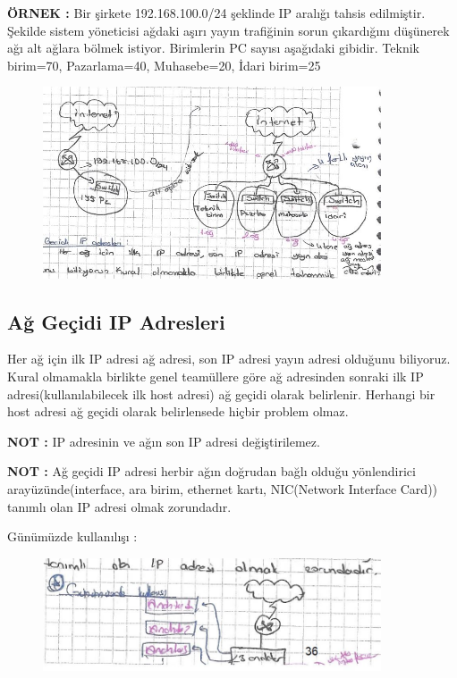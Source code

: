 \textbf{ÖRNEK : } Bir şirkete 192.168.100.0/24 şeklinde IP aralığı tahsis edilmiştir. Şekilde sistem yöneticisi ağdaki aşırı yayın trafiğinin sorun çıkardığını düşünerek ağı alt ağlara bölmek istiyor. Birimlerin PC sayısı aşağıdaki gibidir. Teknik birim=70, Pazarlama=40, Muhasebe=20, İdari birim=25  

\begin{figure}[!ht] \centering \includegraphics[width=10cm]{
images/sayfa36} \label{fig:Şirket örneği 1} \end{figure}

\subsection{Ağ Geçidi IP Adresleri }

Her ağ için ilk IP adresi ağ adresi, son IP adresi yayın adresi olduğunu biliyoruz. Kural olmamakla birlikte genel teamüllere göre ağ adresinden sonraki ilk IP adresi(kullanılabilecek ilk host adresi) ağ geçidi olarak belirlenir. Herhangi bir host adresi ağ geçidi olarak belirlensede hiçbir problem  olmaz. 

\textbf{NOT : } IP adresinin ve ağın son IP adresi değiştirilemez. 

\textbf{NOT : } Ağ geçidi IP adresi herbir ağın doğrudan bağlı olduğu yönlendirici arayüzünde(interface, ara birim, ethernet kartı, NIC(Network Interface Card)) tanımlı olan IP adresi olmak zorundadır. 

Günümüzde kullanılışı : 

\begin{figure}[!ht] \centering \includegraphics[width=10cm]{
images/sayfa36sonresim} \label{fig:Şirket örneği 2} \end{figure}

